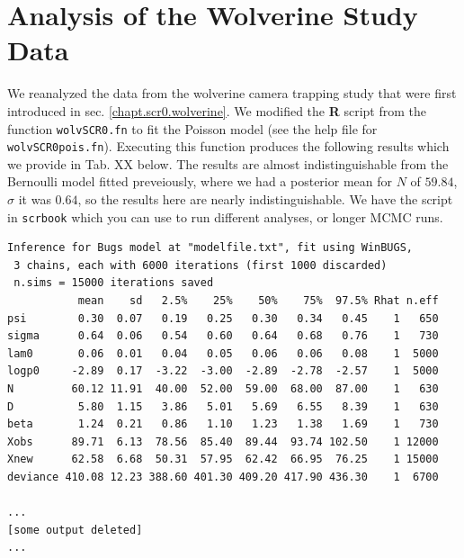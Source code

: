\section{Analysis of the Wolverine Study Data}

We reanalyzed the data from
the  wolverine camera trapping study that were first introduced in 
sec. \ref{chapt.scr0.wolverine}.
We modified the {\bf R} script from the function \mbox{\tt wolvSCR0.fn} to fit the
Poisson model (see the help file for \mbox{\tt
  wolvSCR0pois.fn}). Executing this function produces the following
results which we provide
in Tab. XX below. 
The results are almost indistinguishable from the Bernoulli model
fitted preveiously, where we had a posterior mean for $N$ of
 $59.84$,  $\sigma$ it was
$0.64$, so the results here are nearly indistinguishable. We have the
script in \mbox{\tt scrbook} which you can use to run different
analyses, or longer MCMC runs. 


{\small
\begin{verbatim}
Inference for Bugs model at "modelfile.txt", fit using WinBUGS,
 3 chains, each with 6000 iterations (first 1000 discarded)
 n.sims = 15000 iterations saved
           mean    sd   2.5%    25%    50%    75%  97.5% Rhat n.eff
psi        0.30  0.07   0.19   0.25   0.30   0.34   0.45    1   650
sigma      0.64  0.06   0.54   0.60   0.64   0.68   0.76    1   730
lam0       0.06  0.01   0.04   0.05   0.06   0.06   0.08    1  5000
logp0     -2.89  0.17  -3.22  -3.00  -2.89  -2.78  -2.57    1  5000
N         60.12 11.91  40.00  52.00  59.00  68.00  87.00    1   630
D          5.80  1.15   3.86   5.01   5.69   6.55   8.39    1   630
beta       1.24  0.21   0.86   1.10   1.23   1.38   1.69    1   730
Xobs      89.71  6.13  78.56  85.40  89.44  93.74 102.50    1 12000
Xnew      62.58  6.68  50.31  57.95  62.42  66.95  76.25    1 15000
deviance 410.08 12.23 388.60 401.30 409.20 417.90 436.30    1  6700

...
[some output deleted]
...
\end{verbatim}
}


